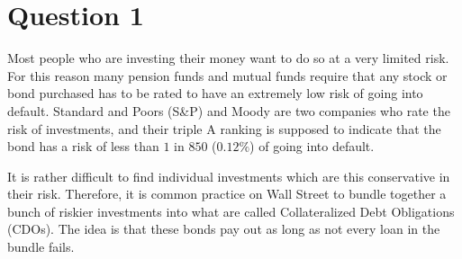 \documentclass[12pt]{article}
\begin{document}
	
	\section*{Question 1}
	
	\noindent Most people who are investing their money want to do so at a very limited risk. For this reason many pension funds and mutual funds require that any stock or bond purchased has to be rated to have an extremely low risk of going into default. Standard and Poors (S\&P) and Moody are two companies who rate the risk of investments, and their triple A ranking is supposed to indicate that the bond has a risk of less than $1$ in $850$ ($0.12\%$) of going into default.
	
	\bigskip
	
	\noindent It is rather difficult to find individual investments which are this conservative in their risk. Therefore, it is common practice on Wall Street to bundle together a bunch of riskier investments into what are called Collateralized Debt Obligations (CDOs). The idea is that these bonds pay out as long as not every loan in the bundle fails.
	
	\bigskip
	
\end{document}
